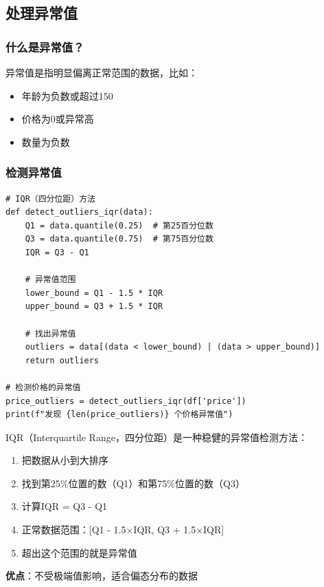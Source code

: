 \documentclass[12pt,a4paper]{article}
\begin{document}
\subsection{处理异常值}

\subsubsection{什么是异常值？}

异常值是指明显偏离正常范围的数据，比如：
\begin{itemize}
    \item 年龄为负数或超过150
    \item 价格为0或异常高
    \item 数量为负数
\end{itemize}

\subsubsection{检测异常值}

\begin{lstlisting}[caption={使用IQR方法检测异常值}]
# IQR（四分位距）方法
def detect_outliers_iqr(data):
    Q1 = data.quantile(0.25)  # 第25百分位数
    Q3 = data.quantile(0.75)  # 第75百分位数
    IQR = Q3 - Q1
    
    # 异常值范围
    lower_bound = Q1 - 1.5 * IQR
    upper_bound = Q3 + 1.5 * IQR
    
    # 找出异常值
    outliers = data[(data < lower_bound) | (data > upper_bound)]
    return outliers

# 检测价格的异常值
price_outliers = detect_outliers_iqr(df['price'])
print(f"发现 {len(price_outliers)} 个价格异常值")
\end{lstlisting}

\begin{knowledgebox}
IQR（Interquartile Range，四分位距）是一种稳健的异常值检测方法：

\begin{enumerate}
    \item 把数据从小到大排序
    \item 找到第25\%位置的数（Q1）和第75\%位置的数（Q3）
    \item 计算IQR = Q3 - Q1
    \item 正常数据范围：[Q1 - 1.5×IQR, Q3 + 1.5×IQR]
    \item 超出这个范围的就是异常值
\end{enumerate}

\textbf{优点}：不受极端值影响，适合偏态分布的数据
\end{knowledgebox}
\end{document}
